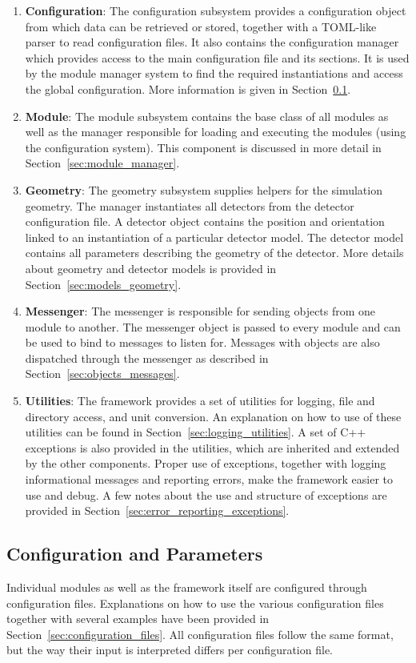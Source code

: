 \begin{enumerate}
\item \textbf{Configuration}: The configuration subsystem provides a configuration object from which data can be retrieved or stored, together with a TOML-like~\cite{tomlgit} parser to read configuration files.
It also contains the \apsq configuration manager which provides access to the main configuration file and its sections.
It is used by the module manager system to find the required instantiations and access the global configuration.
More information is given in Section~\ref{sec:config_parameters}.
\item \textbf{Module}: The module subsystem contains the base class of all \apsq modules as well as the manager responsible for loading and executing the modules (using the configuration system).
This component is discussed in more detail in Section~\ref{sec:module_manager}.
\item \textbf{Geometry}: The geometry subsystem supplies helpers for the simulation geometry.
The manager instantiates all detectors from the detector configuration file.
A detector object contains the position and orientation linked to an instantiation of a particular detector model.
The detector model contains all parameters describing the geometry of the detector.
More details about geometry and detector models is provided in Section~\ref{sec:models_geometry}.
\item \textbf{Messenger}: The messenger is responsible for sending objects from one module to another.
The messenger object is passed to every module and can be used to bind to messages to listen for.
Messages with objects are also dispatched through the messenger as described in Section~\ref{sec:objects_messages}.
\item \textbf{Utilities}: The framework provides a set of utilities for logging, file and directory access, and unit conversion.
An explanation on how to use of these utilities can be found in Section~\ref{sec:logging_utilities}.
A set of C++ exceptions is also provided in the utilities, which are inherited and extended by the other components.
Proper use of exceptions, together with logging informational messages and reporting errors, make the framework easier to use and debug.
A few notes about the use and structure of exceptions are provided in Section~\ref{sec:error_reporting_exceptions}.
\end{enumerate}

\subsection{Configuration and Parameters}
\label{sec:config_parameters}
Individual modules as well as the framework itself are configured through configuration files.
Explanations on how to use the various configuration files together with several examples have been provided in Section~\ref{sec:configuration_files}.
All configuration files follow the same format, but the way their input is interpreted differs per configuration file.

